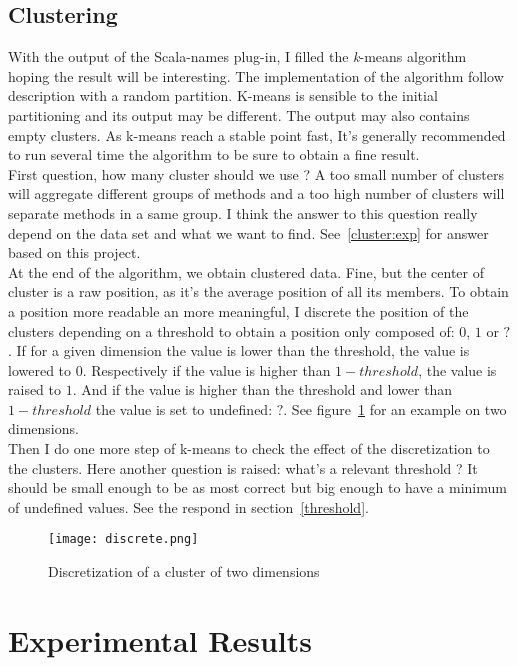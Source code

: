 \documentclass[12pt]{article}
\begin{document}
\subsection{Clustering}
\label{cluster}
With the output of the Scala-names plug-in, I filled the \textit{k}-means algorithm~\cite{kMeans} hoping the result will be interesting. The implementation of the algorithm follow~\cite{kMeans} description with a random partition. K-means is sensible to the initial partitioning and its output may be different. The output may also contains empty clusters. As k-means reach a stable point fast, It's generally recommended to run several time the algorithm to be sure to obtain a fine result.\\
First question, how many cluster should we use ? A too small number of clusters will aggregate different groups of methods and a too high number of clusters will separate methods in a same group. I think the answer to this question really depend on the data set and what we want to find. See~\ref{cluster:exp} for answer based on this project.\\
At the end of the algorithm, we obtain clustered data. Fine, but the center of cluster is a raw position, as it's the average position of all its members. To obtain a position more readable an more meaningful, I discrete the position of the clusters depending on a threshold to obtain a position only composed of: $0$, $1$ or $?$. If for a given dimension the value is lower than the threshold, the value is lowered to $0$. Respectively if the value is higher than $1-threshold$, the value is raised to $1$. And if the value is higher than the threshold and lower than $1-threshold$ the value is set to undefined: $?$. See figure~\ref{discrete} for an example on two dimensions.\\
Then I do one more step of k-means to check the effect of the discretization to the clusters. Here another question is raised: what's a relevant threshold ? It should be small enough to be as most correct but big enough to have a minimum of undefined values. See the respond in section~\ref{threshold}.
\begin{figure}[tbc]
\centering
\texttt{[image: discrete.png]}
\caption{Discretization of a cluster of two dimensions}
\label{discrete}
\end{figure}

\section {Experimental Results}
\end{document}
